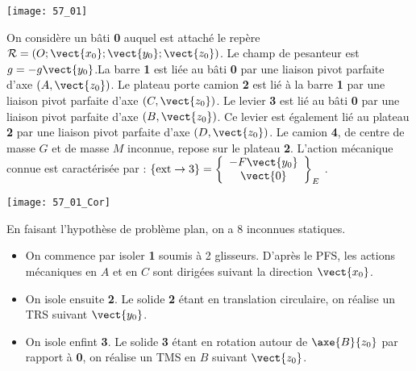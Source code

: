 \normalfalse \difficiletrue \tdifficilefalse
\correctiontrue


\setcounter{question}{0}%
\ifcorrection
\else
{}
\fi

\ifprof
\else

\begin{marginfigure}
\texttt{[image: 57\_01]}
\end{marginfigure}

On considère un bâti \textbf{0} auquel est attaché le repère$\mathcal{R}=\left(O;\vect{x_0};\vect{y_0};\vect{z_0} \right)$. Le champ de pesanteur est $g=-g\vect{y_0}$.La barre \textbf{1} est liée au bâti \textbf{0} par une liaison pivot parfaite d’axe $\left(A,\vect{z_0}\right)$. Le plateau porte camion \textbf{2} est lié à la barre \textbf{1} par une liaison pivot parfaite d’axe $\left(C,\vect{z_0}\right)$. Le levier \textbf{3} est lié au bâti \textbf{0} par une liaison pivot parfaite d’axe $\left(B,\vect{z_0}\right)$. Ce levier est également lié au plateau \textbf{2} par une liaison pivot parfaite d’axe $\left(D,\vect{z_0}\right)$. Le camion \textbf{4}, de centre de masse $G$ et de masse $M$ inconnue, repose sur le plateau \textbf{2}.
L’action mécanique connue est caractérisée par : $\{\text{ext}\rightarrow 3\}=\left\{
\begin{array}{c}
-F\vect{y_0} \\
\vect{0} \\
\end{array}
\right\}_E$ .




\fi

\ifprof

\begin{marginfigure}
\texttt{[image: 57\_01\_Cor]}
\end{marginfigure}

En faisant l'hypothèse de problème plan, on a 8 inconnues statiques. 
\else
\fi



\ifprof
\begin{itemize}
\item On commence par isoler \textbf{1} soumis à 2 glisseurs. D'après le PFS, les actions mécaniques en $A$ et en $C$ sont dirigées suivant la direction $\vect{x_0}$.
\item On isole ensuite \textbf{2}. Le solide \textbf{2} étant en translation circulaire, on réalise un TRS suivant $\vect{y_0}$. 
\item On isole enfint \textbf{3}. Le solide \textbf{3} étant en rotation autour de $\axe{B}{z_0}$ par rapport à \textbf{0},  on réalise un TMS en $B$ suivant $\vect{z_0}$. 
\end{itemize}
\else
\fi
\ifprof
\else


\fi